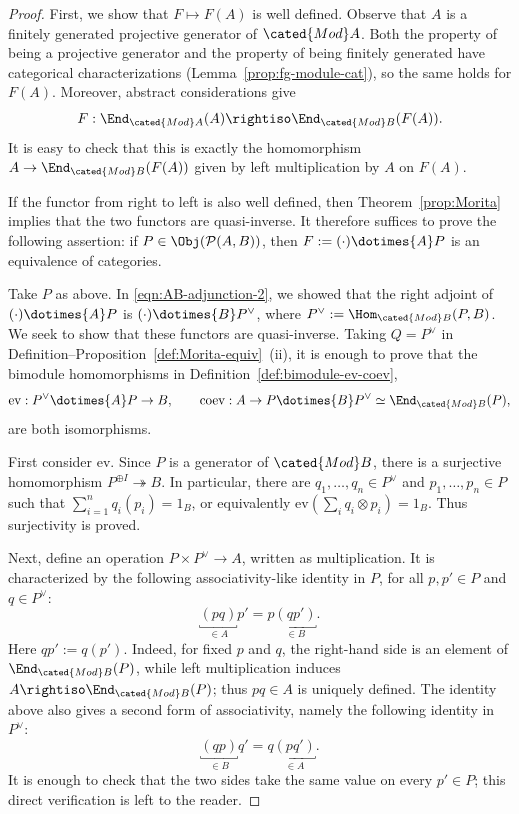 \begin{proof}
	First, we show that $F\mapsto F(A)$ is well defined. Observe that $A$ is a
	finitely generated projective generator of $\cated{Mod}A$. Both the
	property of being a projective generator and the property of being
	finitely generated have categorical characterizations
	(Lemma~\ref{prop:fg-module-cat}), so the same holds for $F(A)$. Moreover,
	abstract considerations give
	\[
	F:\End_{\cated{Mod}A}(A)\rightiso
	\End_{\cated{Mod}B}(F(A)).
	\]
	It is easy to check that this is exactly the homomorphism
	$A\to\End_{\cated{Mod}B}(F(A))$ given by left multiplication by $A$ on
	$F(A)$.

	If the functor from right to left is also well defined, then
	Theorem~\ref{prop:Morita} implies that the two functors are quasi-inverse.
	It therefore suffices to prove the following assertion: if
	$P\in\Obj(\mathcal{P}(A,B))$, then
	$F:=(\cdot)\dotimes{A}P$ is an equivalence of categories.

	Take $P$ as above. In \eqref{eqn:AB-adjunction-2}, we showed that the right
	adjoint of $(\cdot)\dotimes{A}P$ is
	$(\cdot)\dotimes{B}P^\vee$, where
	$P^\vee:=\Hom_{\cated{Mod}B}(P,B)$. We seek to show that these functors are
	quasi-inverse. Taking $Q=P^\vee$ in
	Definition--Proposition~\ref{def:Morita-equiv}~(ii), it is enough to prove
	that the bimodule homomorphisms in
	Definition~\ref{def:bimodule-ev-coev},
	\[
	\mathrm{ev}:P^\vee\dotimes{A}P\to B,\qquad
	\mathrm{coev}:A\to P\dotimes{B}P^\vee
	\simeq\End_{\cated{Mod}B}(P),
	\]
	are both isomorphisms.

	First consider $\mathrm{ev}$. Since $P$ is a generator of
	$\cated{Mod}B$, there is a surjective homomorphism
	$P^{\oplus I}\twoheadrightarrow B$. In particular, there are
	$q_1,\ldots,q_n\in P^\vee$ and $p_1,\ldots,p_n\in P$ such that
	$\sum_{i=1}^n q_i(p_i)=1_B$, or equivalently
	$\mathrm{ev}(\sum_i q_i\otimes p_i)=1_B$. Thus surjectivity is proved.

	Next, define an operation $P\times P^\vee\to A$, written as
	multiplication. It is characterized by the following associativity-like
	identity in $P$, for all $p,p'\in P$ and $q\in P^\vee$:
	\[
	\underbracket{(pq)}_{\in A}p'
	= p\underbracket{(qp')}_{\in B}.
	\]
	Here $qp':=q(p')$. Indeed, for fixed $p$ and $q$, the right-hand side is
	an element of $\End_{\cated{Mod}B}(P)$, while left multiplication induces
	$A\rightiso\End_{\cated{Mod}B}(P)$; thus $pq\in A$ is uniquely defined.
	The identity above also gives a second form of associativity, namely the
	following identity in $P^\vee$:
	\[
	\underbracket{(qp)}_{\in B}q'
	= q\underbracket{(pq')}_{\in A}.
	\]
	It is enough to check that the two sides take the same value on every
	$p'\in P$; this direct verification is left to the reader.


\end{proof}
